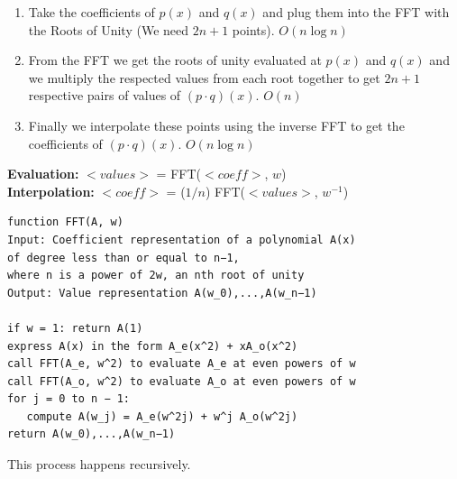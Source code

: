 \documentclass[3pt,landscape]{article}
\begin{document}
\begin{multicols}{3}
\begin{enumerate}
  \item Take the coefficients of $p(x)$ and $q(x)$ and plug them into the FFT with the Roots of Unity (We need $2n+1$ points). \(O(n\log{n})\)
  \item From the FFT we get the roots of unity evaluated at $p(x)$ and $q(x)$ and we multiply the respected values from each root together to get $2n+1$ respective pairs of values of $(p \cdot q)(x)$. \(O(n)\)
  \item Finally we interpolate these points using the inverse FFT to get the coefficients of $(p \cdot q)(x)$. \(O(n\log{n})\)
\end{enumerate}
\textbf{Evaluation: }$<values>$ = FFT($<coeff>$, $w$)\\
\textbf{Interpolation: }$<coeff>$ = ($1/n$) FFT($<values>$, $w^{-1}$)\\

\begin{verbatim}
function FFT(A, w)
Input: Coefficient representation of a polynomial A(x)
of degree less than or equal to n−1, 
where n is a power of 2w, an nth root of unity
Output: Value representation A(w_0),...,A(w_n−1)

if w = 1: return A(1)
express A(x) in the form A_e(x^2) + xA_o(x^2)
call FFT(A_e, w^2) to evaluate A_e at even powers of w 
call FFT(A_o, w^2) to evaluate A_o at even powers of w 
for j = 0 to n − 1:
   compute A(w_j) = A_e(w^2j) + w^j A_o(w^2j) 
return A(w_0),...,A(w_n−1)
\end{verbatim}

This process happens recursively. 


\end{multicols}
\end{document}
